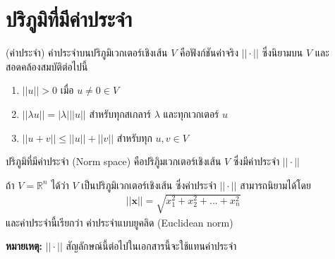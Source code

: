 \section{ปริภูมิที่มีค่าประจำ}

\begin{Definition}
    (ค่าประจำ)  ค่าประจำบนปริภูมิเวกเตอร์เชิงเส้น $V$ คือฟังก์ชันค่าจริง $ || \cdot ||$ ซึ่งนิยามบน $V$ และสอดคล้องสมบัติต่อไปนี้ 
    \begin{enumerate}
        \item $ ||u|| > 0 $ เมื่อ $ u \neq 0 \in V $
        \item $|| \lambda u || = | \lambda | || u || $ สำหรับทุกสเกลาร์ $\lambda$ และทุกเวกเตอร์ $u$
        \item $ ||u+v|| \leq ||u|| + ||v || $ สำหรับทุก $u,v \in V$
    \end{enumerate}
\end{Definition}

\begin{Definition} ปริภูมิที่มีค่าประจำ (Norm space) คือปริภูิมเวกเตอร์เชิงเส้น $V$ ซึ่งมีค่าประจำ $ || \cdot ||$
\end{Definition}

\begin{Example}
    ถ้า $V = \mathbb{R}^{n}$ ได้ว่า $V$ เป็นปริภูมิเวกเตอร์เชิงเส้น ซึ่งค่าประจำ $ || \cdot ||$ สามารถนิยามได้โดย
    \begin{align}
        || \boldsymbol{x} || = \sqrt{x_1^2 + x_2^2 + ... + x_n^2 } 
    \end{align}
    และค่าประจำนี้เรียกว่า ค่าประจำแบบยูคลิด (Euclidean norm) 
\end{Example}

\textbf{หมายเหตุ:} $ || \cdot ||$ สัญลักษณ์นี้ต่อไปในเอกสารนี้จะใช้แทนค่าประจำ